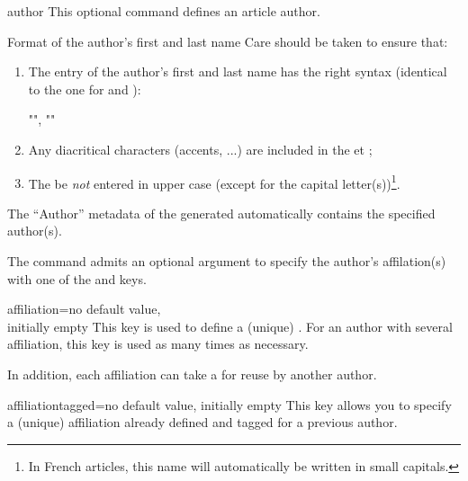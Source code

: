 \documentclass[english,nolocaltoc]{nwejmart}
\newtheorem[style=definition]{fact}
\newtheorem[title-plural=Criteria]{criterion}
\newtheorem[title=random experiment]{rexp}
\begin{document}
\begin{docCommand}{author}{}
  This optional command defines an article author.
\end{docCommand}
%
\begin{dbwarning}{Format of the author's first and last name}{}
  Care should be taken to ensure that:
  \begin{enumerate}
  \item The entry of the author's first and last name has the right syntax (identical to the one for  and ):
\begin{bodycode}[listing options={showspaces}]
"", ""
\end{bodycode}
  \item Any diacritical characters (accents, ...) are included in the  et  ;
  \item The  be \emph{not} entered in upper case (except for the capital letter(s))\footnote{In French articles, this name will automatically be written in small capitals.}.
  \end{enumerate}

 The \enquote{Author} metadata of the generated  automatically contains the specified author(s).
\end{dbwarning}

The  command admits an optional argument to specify the
author's affilation(s) with one of  the 
and  keys.

\begin{docKey}{affiliation}{={}}{no
    default value,\\initially empty}
  This key is used to define a  (unique) . For an
  author with several affiliation, this key is used as many times as necessary.

  In addition, each affiliation can take a  for reuse by
  another author.
\end{docKey}

\begin{docKey}{affiliationtagged}{={}}{no
    default value, initially empty}
  This key allows you to specify a (unique) affiliation already
  defined and tagged for a previous author.
\end{docKey}

\end{document}
